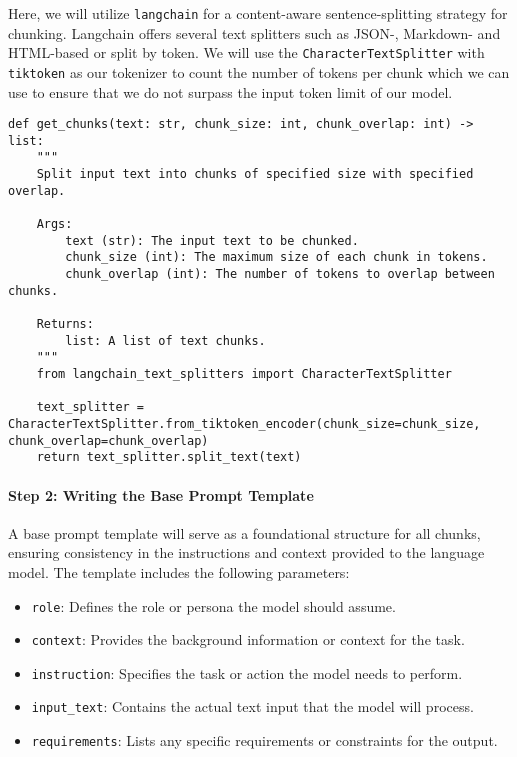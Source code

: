 Here, we will utilize \texttt{langchain} for a content-aware sentence-splitting strategy for chunking. Langchain offers several text splitters  such as JSON-, Markdown- and HTML-based or split by token. We will use the \texttt{CharacterTextSplitter} with \texttt{tiktoken} as our tokenizer to count the number of tokens per chunk which we can use to ensure that we do not surpass the input token limit of our model.
\begin{verbatim}
def get_chunks(text: str, chunk_size: int, chunk_overlap: int) -> list:
    """
    Split input text into chunks of specified size with specified overlap.

    Args:
        text (str): The input text to be chunked.
        chunk_size (int): The maximum size of each chunk in tokens.
        chunk_overlap (int): The number of tokens to overlap between chunks.

    Returns:
        list: A list of text chunks.
    """
    from langchain_text_splitters import CharacterTextSplitter

    text_splitter = CharacterTextSplitter.from_tiktoken_encoder(chunk_size=chunk_size, chunk_overlap=chunk_overlap)
    return text_splitter.split_text(text)
\end{verbatim}

\paragraph{Step 2: Writing the Base Prompt Template}

A base prompt template will serve as a foundational structure for all chunks, ensuring consistency in the instructions and context provided to the language model. The template includes the following parameters:

\begin{itemize}
\item \texttt{role}: Defines the role or persona the model should assume.
\item \texttt{context}: Provides the background information or context for the task.
\item \texttt{instruction}: Specifies the task or action the model needs to perform.
\item \texttt{input\_text}: Contains the actual text input that the model will process.
\item \texttt{requirements}: Lists any specific requirements or constraints for the output.
\end{itemize}

